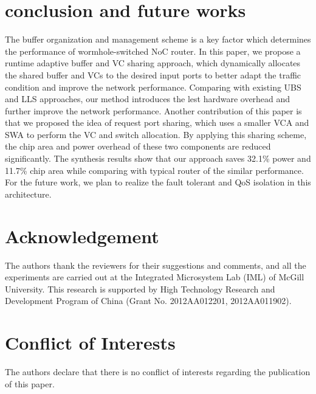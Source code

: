 \documentclass[10pt,conference]{IEEEtran}
\begin{document}
\section{conclusion and future works}\label{conc}
The buffer organization and management scheme is a key factor which determines the performance of wormhole-switched NoC router. In this paper, we propose a runtime adaptive buffer and VC sharing approach, which dynamically allocates the shared buffer and VCs to the desired input ports to better adapt the traffic condition and improve the network performance. Comparing with existing UBS and LLS approaches, our method introduces the lest hardware overhead and further improve the network performance. Another contribution of this paper is that we proposed the idea of request port sharing, which uses a smaller VCA and SWA to perform the VC and switch allocation. By applying this sharing scheme, the chip area and power overhead of these two components are reduced significantly. The synthesis results show that our approach saves 32.1\% power and 11.7\% chip area while comparing with typical router of the similar performance. For the future work, we plan to realize the fault tolerant and QoS isolation in this architecture.

\section*{Acknowledgement}
The authors thank the reviewers for their suggestions and comments, and all the experiments are carried out at the Integrated Microsystem Lab (IML) of McGill University. This research is supported by High Technology Research and Development Program of China (Grant No. 2012AA012201, 2012AA011902).

\section*{Conflict of Interests}
The authors declare that there is no conflict of interests regarding the publication of this paper.



\end{document}
